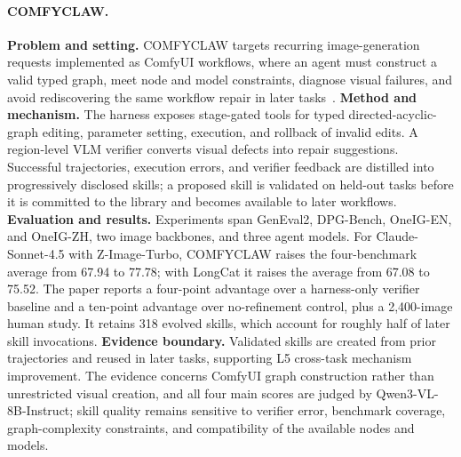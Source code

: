 \paragraph{COMFYCLAW.}
\textbf{Problem and setting.} COMFYCLAW targets recurring image-generation requests implemented as ComfyUI workflows, where an agent must construct a valid typed graph, meet node and model constraints, diagnose visual failures, and avoid rediscovering the same workflow repair in later tasks~\cite{avg260701709}. \textbf{Method and mechanism.} The harness exposes stage-gated tools for typed directed-acyclic-graph editing, parameter setting, execution, and rollback of invalid edits. A region-level VLM verifier converts visual defects into repair suggestions. Successful trajectories, execution errors, and verifier feedback are distilled into progressively disclosed skills; a proposed skill is validated on held-out tasks before it is committed to the library and becomes available to later workflows. \textbf{Evaluation and results.} Experiments span GenEval2, DPG-Bench, OneIG-EN, and OneIG-ZH, two image backbones, and three agent models. For Claude-Sonnet-4.5 with Z-Image-Turbo, COMFYCLAW raises the four-benchmark average from 67.94 to 77.78; with LongCat it raises the average from 67.08 to 75.52. The paper reports a four-point advantage over a harness-only verifier baseline and a ten-point advantage over no-refinement control, plus a 2,400-image human study. It retains 318 evolved skills, which account for roughly half of later skill invocations. \textbf{Evidence boundary.} Validated skills are created from prior trajectories and reused in later tasks, supporting L5 cross-task mechanism improvement. The evidence concerns ComfyUI graph construction rather than unrestricted visual creation, and all four main scores are judged by Qwen3-VL-8B-Instruct; skill quality remains sensitive to verifier error, benchmark coverage, graph-complexity constraints, and compatibility of the available nodes and models.

